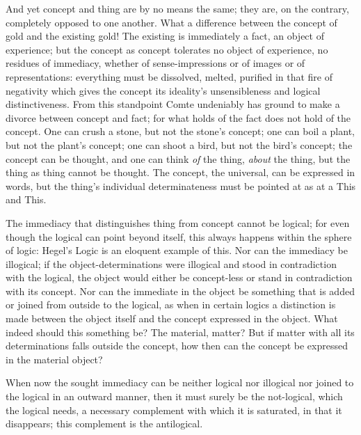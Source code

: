 \documentclass[12pt]{article}
\begin{document}
And yet concept and thing are by no means the same; they are, on the
contrary, completely opposed to one another. What a difference between the
concept of gold and the existing gold! The existing is immediately a fact,
an object of experience; but the concept as concept tolerates no object of
experience, no residues of immediacy, whether of sense-impressions or of
images or of representations: everything must be dissolved, melted, purified
in that fire of negativity which gives the concept its ideality's
unsensibleness and logical distinctiveness. From this standpoint Comte
undeniably has ground to make a divorce between concept and fact; for what
holds of the fact does not hold of the concept. One can crush a stone, but
not the stone's concept; one can boil a plant, but not the plant's concept;
one can shoot a bird, but not the bird's concept; the concept can be
thought, and one can think \emph{of} the thing, \emph{about} the thing, but
the thing as thing cannot be thought. The concept, the universal, can be
expressed in words, but the thing's individual determinateness must be
pointed at as at a This and This.

The immediacy that distinguishes thing from concept cannot be logical; for
even though the logical can point beyond itself, this always happens within
the sphere of logic: Hegel's
Logic is an eloquent example of this. Nor can the immediacy be illogical; if
the object-determinations were illogical and stood in contradiction with the
logical, the object would either be concept-less or stand in contradiction
with its concept. Nor can the immediate in the object be something that is
added or joined from outside to the logical, as when in certain logics a
distinction is made between the object itself and the concept expressed in
the object. What indeed should this something be? The material, matter? But
if matter with all its determinations falls outside the concept, how then
can the concept be expressed in the material object?

When now the sought immediacy can be neither logical nor illogical nor
joined to the logical in an outward manner, then it must surely be the
not-logical, which the logical needs, a necessary complement with which it
is saturated, in that it disappears; this complement is the antilogical.
\end{document}
